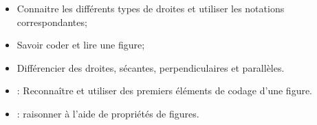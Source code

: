 \begin{myobj}
	\begin{itemize}
		\item Connaitre les différents types de droites et utiliser les notations correspondantes;
		\item Savoir coder et lire une figure;
		\item Différencier des droites, sécantes, perpendiculaires et parallèles.		
	\end{itemize}
\end{myobj}

\begin{mycomp}
	\begin{itemize}
		\item {} :  Reconnaître et utiliser des premiers éléments de codage d'une figure.
		\item {} :  raisonner à l'aide de propriétés de figures.
		
	\end{itemize}
\end{mycomp}